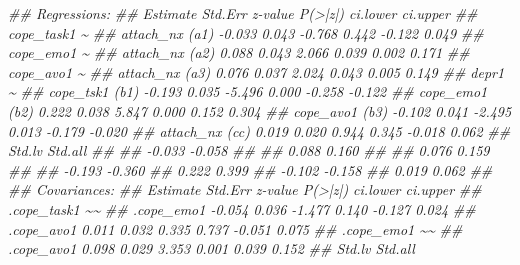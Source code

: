 \documentclass[
  chinese-hans,
  letterpaper,
  DIV=11,
  numbers=noendperiod]{scrartcl}
\newenvironment{Shaded}{\begin{snugshade}}{\end{snugshade}}
\newcommand{\DocumentationTok}[1]{\textcolor[rgb]{0.37,0.37,0.37}{\textit{#1}}}
\begin{document}
\begin{Shaded}
\begin{Highlighting}[numbers=left,,]
\DocumentationTok{\#\# Regressions:}
\DocumentationTok{\#\#                    Estimate  Std.Err  z{-}value  P(\textgreater{}|z|) ci.lower ci.upper}
\DocumentationTok{\#\#   cope\_task1 \textasciitilde{}                                                          }
\DocumentationTok{\#\#     attach\_nx (a1)   {-}0.033    0.043   {-}0.768    0.442   {-}0.122    0.049}
\DocumentationTok{\#\#   cope\_emo1 \textasciitilde{}                                                           }
\DocumentationTok{\#\#     attach\_nx (a2)    0.088    0.043    2.066    0.039    0.002    0.171}
\DocumentationTok{\#\#   cope\_avo1 \textasciitilde{}                                                           }
\DocumentationTok{\#\#     attach\_nx (a3)    0.076    0.037    2.024    0.043    0.005    0.149}
\DocumentationTok{\#\#   depr1 \textasciitilde{}                                                               }
\DocumentationTok{\#\#     cope\_tsk1 (b1)   {-}0.193    0.035   {-}5.496    0.000   {-}0.258   {-}0.122}
\DocumentationTok{\#\#     cope\_emo1 (b2)    0.222    0.038    5.847    0.000    0.152    0.304}
\DocumentationTok{\#\#     cope\_avo1 (b3)   {-}0.102    0.041   {-}2.495    0.013   {-}0.179   {-}0.020}
\DocumentationTok{\#\#     attach\_nx (cc)    0.019    0.020    0.944    0.345   {-}0.018    0.062}
\DocumentationTok{\#\#    Std.lv  Std.all}
\DocumentationTok{\#\#                   }
\DocumentationTok{\#\#    {-}0.033   {-}0.058}
\DocumentationTok{\#\#                   }
\DocumentationTok{\#\#     0.088    0.160}
\DocumentationTok{\#\#                   }
\DocumentationTok{\#\#     0.076    0.159}
\DocumentationTok{\#\#                   }
\DocumentationTok{\#\#    {-}0.193   {-}0.360}
\DocumentationTok{\#\#     0.222    0.399}
\DocumentationTok{\#\#    {-}0.102   {-}0.158}
\DocumentationTok{\#\#     0.019    0.062}
\DocumentationTok{\#\# }
\DocumentationTok{\#\# Covariances:}
\DocumentationTok{\#\#                    Estimate  Std.Err  z{-}value  P(\textgreater{}|z|) ci.lower ci.upper}
\DocumentationTok{\#\#  .cope\_task1 \textasciitilde{}\textasciitilde{}                                                         }
\DocumentationTok{\#\#    .cope\_emo1        {-}0.054    0.036   {-}1.477    0.140   {-}0.127    0.024}
\DocumentationTok{\#\#    .cope\_avo1         0.011    0.032    0.335    0.737   {-}0.051    0.075}
\DocumentationTok{\#\#  .cope\_emo1 \textasciitilde{}\textasciitilde{}                                                          }
\DocumentationTok{\#\#    .cope\_avo1         0.098    0.029    3.353    0.001    0.039    0.152}
\DocumentationTok{\#\#    Std.lv  Std.all}

\end{Highlighting}
\end{Shaded}
\end{document}
